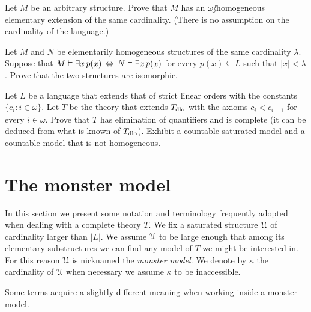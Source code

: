 \documentclass[creche.tex]{subfiles}
\begin{document}
\begin{exercise}\label{ex_omega_homogeneous_same_card}
Let $M$ be an arbitrary structure. Prove that $M$ has an $\omega\jj$homogeneous elementary extension of the same cardinality. (There is no assumption on the cardinality of the language.)\QED 
\end{exercise}

\begin{exercise}
Let $M$ and $N$ be elementarily homogeneous structures of the same cardinality $\lambda$. Suppose that $M\vDash\exists x\, p(x)\,\Leftrightarrow\,N\vDash\exists x\, p(x)$ for every $p(x)\subseteq L$ such that $|x|<\lambda$. Prove that the two structures are isomorphic.\QED 
\end{exercise}

\begin{exercise}\label{vaughtesempio}
Let $L$ be a language that extends that of strict linear orders with the constants $\{c_i: i\in\omega\}$. Let $T$ be the theory that extends $T_{\rm dlo}$ with the axioms $c_i<c_{i+1}$ for every  $i\in\omega$. Prove that $T$ has elimination of quantifiers and is complete (it can be deduced from what is known of $T_{\rm dlo}$). Exhibit a countable saturated model and a countable model that is not homogeneous.\QED 
\end{exercise}

\section{The monster model}\label{monster}

\label{compattezzasaturazione}


In this section we present some notation and terminology frequently adopted when dealing with a complete theory $T$. We fix a saturated structure $\EuScript U$ of cardinality larger than $|L|$. We assume $\EuScript U$ to be large enough that among its elementary substructures we can find any model of $T$ we might be interested in. For this reason $\EuScript U$ is nicknamed the \emph{monster model}. We denote by $\kappa$ the cardinality of $\EuScript U$ when necessary we assume $\kappa$ to be inaccessible. 

Some terms acquire a slightly different meaning when working inside a monster model.


\newcommand{\labellalunga}[1]{#1\hfill}
\newenvironment{litemize}[1]
   {\begin{list}{}{
   \setlength{\parskip}{0mm}
   \setlength{\topsep}{5mm}
   \setlength{\partopsep}{0mm}
   \setlength{\rightmargin}{0mm}
   \setlength{\listparindent}{0mm}
   \setlength{\itemindent}{0mm}
   \setlength{\itemsep}{3mm}
   \settowidth{\labelwidth}{#1}
   \setlength{\parsep}{0mm}
   \setlength{\partopsep}{0mm}
   \setlength{\labelsep}{3mm}
   \setlength{\leftmargin}{\labelwidth+\labelsep}
   \let\makelabel\labellalunga}}{
   \end{list}}
\end{document}
